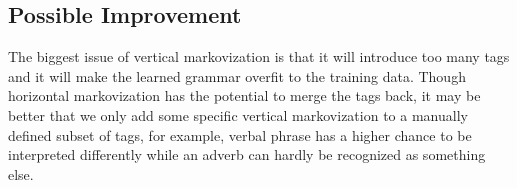 \documentclass[letterpaper]{article}
\begin{document}
\subsection{Possible Improvement}
The biggest issue of vertical markovization is that it will introduce too many tags and it will make the learned grammar overfit to the training data. Though horizontal markovization has the potential to merge the tags back, it may be better that we only add some specific vertical markovization to a manually defined subset of tags, for example, verbal phrase has a higher chance to be interpreted differently while an adverb can hardly be recognized as something else.
\end{document}
